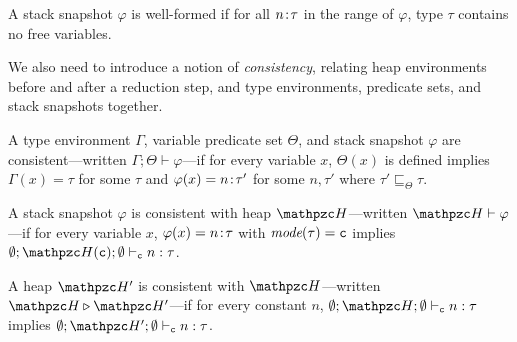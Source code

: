 \begin{defi}
A stack snapshot $\varphi$ is well-formed if
for all ${n}\!:\!{\tau}$ in the range of $\varphi$, type $\tau$
contains no free variables. 
\end{defi}

We also need to introduce a notion of
\emph{consistency}, relating heap environments before and after a
reduction step, and type environments, predicate sets, and stack
snapshots together.


\begin{defi}
A type environment $\Gamma$, variable predicate set $\Theta$, and
stack snapshot $\varphi$ are consistent---written $\Gamma;\Theta\vdash
\varphi$---if for every variable $x$, $\Theta(x)$ is defined implies
$\Gamma(x) = \tau$ for some $\tau$ and 
$\varphi(x) ={n}\!:\!{\tau'}$ for some $n,\tau'$ where $\tau' \sqsubseteq_{\Theta} \tau$. 
\end{defi}

\begin{defi}
A stack snapshot $\varphi$ is consistent with heap $\heap$---written $\heap \vdash \varphi$---if
for every variable $x$, $\varphi(x)= {n}\!:\!{\tau}$ with $\textit{mode}(\tau)=\texttt{c}$ implies $\emptyset;\heap(\cmode);\emptyset \vdash_{\cmode} n:\tau$.
\end{defi}

\begin{defi}
A heap $\heap'$ is consistent with $\heap$---written $\heap \triangleright \heap'$---if
for every constant $n$, $\emptyset;\heap;\emptyset \vdash_{\cmode} n:\tau$ implies $\emptyset;\heap';\emptyset \vdash_{\cmode} n:\tau$.
\end{defi}
